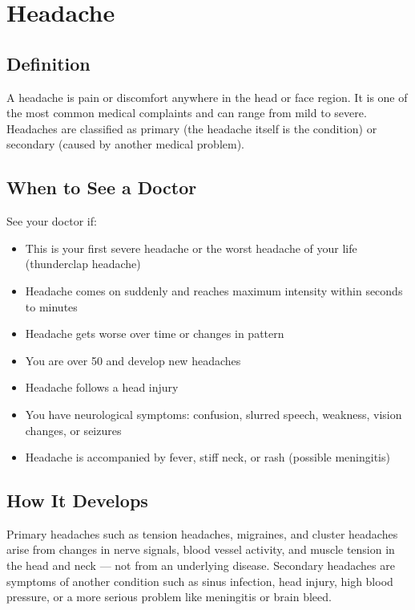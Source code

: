 \chapter{Headache}

\section*{Definition}
A headache is pain or discomfort anywhere in the head or face region. It is one of the most common medical complaints and can range from mild to severe. Headaches are classified as primary (the headache itself is the condition) or secondary (caused by another medical problem).

\section*{When to See a Doctor}
See your doctor if:
\begin{itemize}
  \item This is your first severe headache or the worst headache of your life (thunderclap headache)
  \item Headache comes on suddenly and reaches maximum intensity within seconds to minutes
  \item Headache gets worse over time or changes in pattern
  \item You are over 50 and develop new headaches
  \item Headache follows a head injury
  \item You have neurological symptoms: confusion, slurred speech, weakness, vision changes, or seizures
  \item Headache is accompanied by fever, stiff neck, or rash (possible meningitis)
\end{itemize}

\section*{How It Develops}
Primary headaches such as tension headaches, migraines, and cluster headaches arise from changes in nerve signals, blood vessel activity, and muscle tension in the head and neck — not from an underlying disease. Secondary headaches are symptoms of another condition such as sinus infection, head injury, high blood pressure, or a more serious problem like meningitis or brain bleed.

